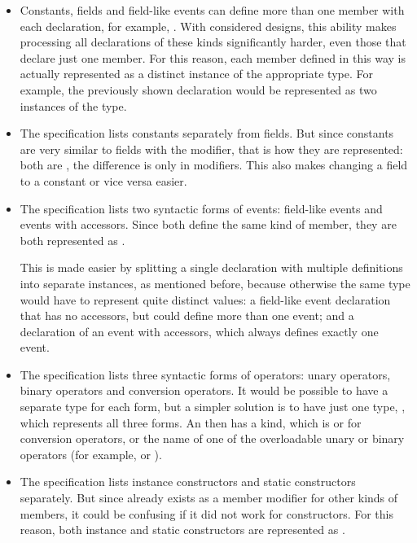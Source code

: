 \begin{itemize}
\item Constants, fields and field-like events can define more than one member with each declaration, for example, . With considered designs, this ability makes processing all declarations of these kinds significantly harder, even those that declare just one member. For this reason, each member defined in this way is actually represented as a distinct instance of the appropriate type. For example, the previously shown declaration would be represented as two instances of the  type.

\item The specification lists constants separately from fields. But since constants are very similar to fields with the  modifier, that is how they are represented: both are , the difference is only in modifiers. This also makes changing a field to a constant or vice versa easier.

\item The specification lists two syntactic forms of events: field-like events and events with accessors. Since both define the same kind of member, they are both represented as .

This is made easier by splitting a single declaration with multiple definitions into separate instances, as mentioned before, because otherwise the same type would have to represent quite distinct values: a field-like event declaration that has no accessors, but could define more than one event; and a declaration of an event with accessors, which always defines exactly one event.

\item The specification lists three syntactic forms of operators: unary operators, binary operators and conversion operators. It would be possible to have a separate type for each form, but a simpler solution is to have just one type, , which represents all three forms. An  then has a kind, which is  or  for conversion operators, or the name of one of the overloadable unary or binary operators (for example,  or ).

\item The specification lists instance constructors and static constructors separately. But since  already exists as a member modifier for other kinds of members, it could be confusing if it did not work for constructors. For this reason, both instance and static constructors are represented as .


\end{itemize}
